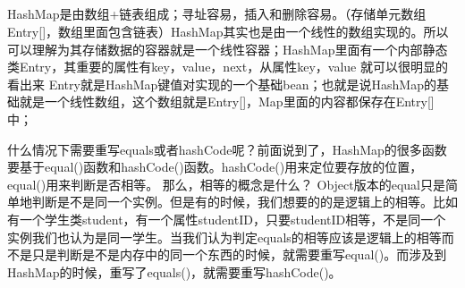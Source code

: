 \documentclass[../../../interview-questions.tex]{subfiles}
\begin{document}
\subsection{\color{red}{HashMap原理}}

HashMap是由数组+链表组成；寻址容易，插入和删除容易。（存储单元数组Entry[]，数组里面包含链表）HashMap其实也是由一个线性的数组实现的。所以可以理解为其存储数据的容器就是一个线性容器；HashMap里面有一个内部静态类Entry，其重要的属性有key，value，next，从属性key，value 就可以很明显的看出来 Entry就是HashMap键值对实现的一个基础bean；也就是说HashMap的基础就是一个线性数组，这个数组就是Entry[]，Map里面的内容都保存在Entry[]中；

什么情况下需要重写equals或者hashCode呢？前面说到了，HashMap的很多函数要基于equal()函数和hashCode()函数。hashCode()用来定位要存放的位置，equal()用来判断是否相等。
那么，相等的概念是什么？
Object版本的equal只是简单地判断是不是同一个实例。但是有的时候，我们想要的的是逻辑上的相等。比如有一个学生类student，有一个属性studentID，只要studentID相等，不是同一个实例我们也认为是同一学生。当我们认为判定equals的相等应该是逻辑上的相等而不是只是判断是不是内存中的同一个东西的时候，就需要重写equal()。而涉及到HashMap的时候，重写了equals()，就需要重写hashCode()。
\end{document}
